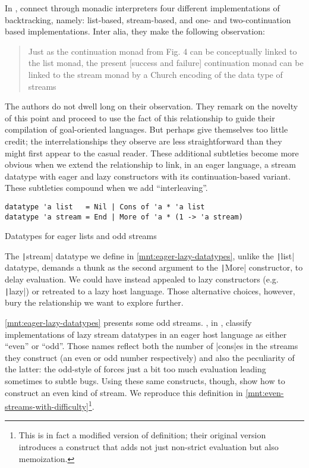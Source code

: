 \documentclass[screen,anonymous,review,draft,natbib=false]{acmart} %
\begin{document}
In , \citeauthor{danvy2002unifying}
connect through monadic interpreters four different implementations of
backtracking, namely: list-based, stream-based, and one- and
two-continuation based implementations. Inter alia, they make the
following observation:
%
\begin{quote}
  Just as the continuation monad from Fig. 4 can be conceptually
  linked to the list monad, the present [success and failure]
  continuation monad can be linked to the stream monad by a Church
  encoding of the data type of streams
\end{quote}
%
The authors do not dwell long on their observation. They remark on the
novelty of this point and proceed to use the fact of this relationship
to guide their compilation of goal-oriented languages. But
\citeauthor{danvy2002unifying} perhaps give themselves too little
credit; the interrelationships they observe are less straightforward
than they might first appear to the casual reader. These additional
subtleties become more obvious when we extend the relationship to
link, in an eager language, a stream datatype with eager and lazy
constructors with its continuation-based variant. These subtleties
compound when we add \enquote{interleaving}.

\begin{listing}
\begin{verbatim}
datatype 'a list   = Nil | Cons of 'a * 'a list
datatype 'a stream = End | More of 'a * (1 -> 'a stream)
\end{verbatim}
\caption{Datatypes for eager lists and odd streams}
\label{mnt:eager-lazy-datatypes}
\end{listing}

The \texttt|stream| datatype we define in
\cref{mnt:eager-lazy-datatypes}, unlike the \texttt|list|
datatype, demands a thunk as the second argument to the
\texttt|More| constructor, to delay evaluation. We could have
instead appealed to lazy constructors (e.g. \texttt|lazy|) or
retreated to a lazy host language. Those alternative choices, however,
bury the relationship we want to explore further.

\cref{mnt:eager-lazy-datatypes} presents some odd
streams. \citeauthor{wadler1998add}, in ,
classify implementations of lazy stream datatypes in an eager host
language as either \enquote{even} or \enquote{odd}. Those names
reflect both the number of \rackinline|cons|es in the streams they
construct (an even or odd number respectively) and also the
peculiarity of the latter: the odd-style of forces just a bit too much
evaluation leading sometimes to subtle bugs. Using these same
constructs, though, \citeauthor{wadler1998add} show how to construct
an even kind of stream. We reproduce this definition in
\cref{mnt:even-streams-with-difficulty}\footnote{This is in fact a
  modified version of  definition; their
  original version introduces a construct that adds not just
  non-strict evaluation but also memoization.}.
  
\end{document}
